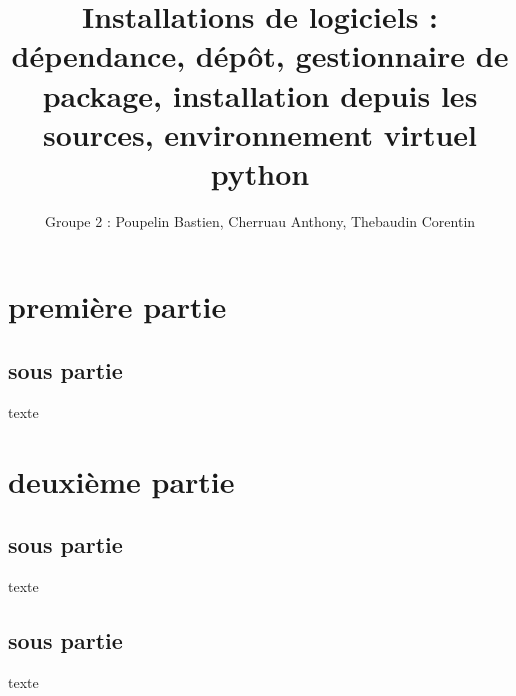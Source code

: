 \documentclass[a4paper,10pt]{article}
\title{\textbf{Installations de logiciels :} \\ dépendance, dépôt, gestionnaire de package, installation depuis les sources, environnement virtuel python}
\author{Groupe 2 : Poupelin Bastien, Cherruau Anthony, Thebaudin Corentin}
\date{}
\begin{document}
\maketitle

\tableofcontents

\clearpage

\section{première partie}

\subsection{sous partie}

texte

\section{deuxième partie}

\subsection{sous partie}

texte

\subsection{sous partie}

texte
\end{document}
